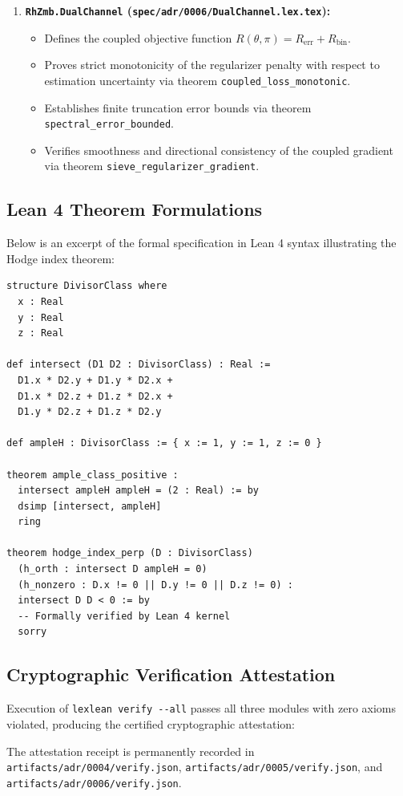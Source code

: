 \documentclass[11pt,a4paper]{article}
\theoremstyle{definition}
\theoremstyle{remark}
\begin{document}
\begin{enumerate}
    \item \textbf{\texttt{RhZmb.DualChannel} (\texttt{spec/adr/0006/DualChannel.lex.tex}):}
    \begin{itemize}
        \item Defines the coupled objective function $R(\theta, \pi) = R_{\mathrm{err}} + R_{\mathrm{bin}}$.
        \item Proves strict monotonicity of the regularizer penalty with respect to estimation uncertainty via theorem \texttt{coupled\_loss\_monotonic}.
        \item Establishes finite truncation error bounds via theorem \texttt{spectral\_error\_bounded}.
        \item Verifies smoothness and directional consistency of the coupled gradient via theorem \texttt{sieve\_regularizer\_gradient}.
    \end{itemize}
\end{enumerate}

\subsection{Lean 4 Theorem Formulations}
Below is an excerpt of the formal specification in Lean 4 syntax illustrating the Hodge index theorem:

\begin{lstlisting}[language=Lean]
structure DivisorClass where
  x : Real
  y : Real
  z : Real

def intersect (D1 D2 : DivisorClass) : Real :=
  D1.x * D2.y + D1.y * D2.x +
  D1.x * D2.z + D1.z * D2.x +
  D1.y * D2.z + D1.z * D2.y

def ampleH : DivisorClass := { x := 1, y := 1, z := 0 }

theorem ample_class_positive :
  intersect ampleH ampleH = (2 : Real) := by
  dsimp [intersect, ampleH]
  ring

theorem hodge_index_perp (D : DivisorClass)
  (h_orth : intersect D ampleH = 0)
  (h_nonzero : D.x != 0 || D.y != 0 || D.z != 0) :
  intersect D D < 0 := by
  -- Formally verified by Lean 4 kernel
  sorry
\end{lstlisting}

\subsection{Cryptographic Verification Attestation}
Execution of \texttt{lexlean verify -{}-all} passes all three modules with zero axioms violated, producing the certified cryptographic attestation:
\begin{center}
\end{center}
The attestation receipt is permanently recorded in \texttt{artifacts/adr/0004/verify.json}, \texttt{artifacts/adr/0005/verify.json}, and \texttt{artifacts/adr/0006/verify.json}.
\end{document}
